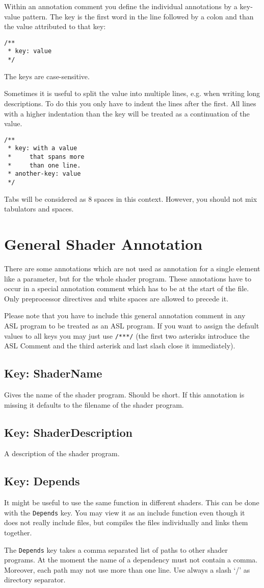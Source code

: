\documentclass[11pt,a4paper]{scrreprt}
\newcommand{\key}[1]{\subsection{Key: #1}}
\begin{document}
Within an annotation comment you define the individual annotations by 
a key-value pattern. The key is the first word in the line followed by a colon 
and than the value attributed to that key:
\begin{lstlisting}
/**
 * key: value
 */
\end{lstlisting}
The keys are case-sensitive.

Sometimes it is useful to split the value into multiple lines, e.g. when writing 
long descriptions. To do this you only have to indent the lines after the first.  
All lines with a higher indentation than the key will be treated as 
a continuation of the value.
\begin{lstlisting}
/**
 * key: with a value
 *     that spans more
 *     than one line.
 * another-key: value
 */
\end{lstlisting}
Tabs will be considered as 8 spaces in this context. However, you should not mix 
tabulators and spaces.

\section{General Shader Annotation}
There are some annotations which are not used as annotation for a single element 
like a parameter, but for the whole shader program. These annotations have to 
occur in a special annotation comment which has to be at the start of the file.  
Only preprocessor directives and white spaces are allowed to precede it.

Please note that you have to include this general annotation comment in any ASL 
program to be treated as an ASL program. If you want to assign the default 
values to all keys you may just use \lstinline$/***/$ (the first two asterisks 
introduce the ASL Comment and the third asterisk and last slash close it 
immediately).

\key{ShaderName}
Gives the name of the shader program. Should be short. If this annotation is 
missing it defaults to the filename of the shader program.
\key{ShaderDescription}
A description of the shader program.

\key{Depends}
It might be useful to use the same function in different shaders. This can be 
done with the \lstinline$Depends$ key. You may view it as an include function 
even though it does not really include files, but compiles the files 
individually and links them together.

The \lstinline$Depends$ key takes a comma separated list of paths to other 
shader programs. At the moment the name of a dependency must not contain 
a comma. Moreover, each path may not use more than one line. Use always a slash 
`/' as directory separator.
\end{document}
